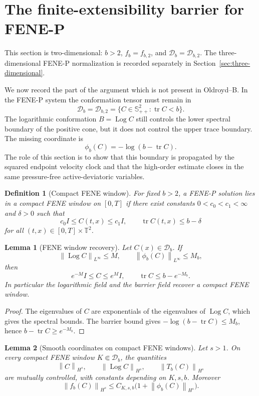 \documentclass[11pt]{article}
\newtheorem{lemma}{Lemma}[section]
\newtheorem{definition}{Definition}[section]
\newcommand{\T}{\mathbb T}
\newcommand{\Id}{I}
\newcommand{\Spp}{\mathbb S_{++}}
\newcommand{\tr}{\operatorname{tr}}
\newcommand{\Log}{\operatorname{Log}}
\newcommand{\calD}{\mathcal D}
\newcommand{\norm}[1]{\left\lVert #1\right\rVert}
\begin{document}
\section{The finite-extensibility barrier for FENE-P}
\label{sec:fene-barrier}

This section is two-dimensional: \(b>2\), \(f_b=f_{b,2}\), and
\(\calD_b=\calD_{b,2}\).  The three-dimensional FENE-P normalization is recorded
separately in Section~\ref{sec:three-dimensional}.

We now record the part of the argument which is not present in Oldroyd--B.  In
the FENE-P system the conformation tensor must remain in
\[
  \calD_b=\calD_{b,2}=\{C\in\Spp^2:\tr C<b\}.
\]
The logarithmic conformation \(B=\Log C\) still controls the lower spectral
boundary of the positive cone, but it does not control the upper trace
boundary.  The missing coordinate is
\[
  \phi_b(C)=-\log(b-\tr C).
\]
The role of this section is to show that this boundary is propagated by the
squared endpoint velocity clock and that the high-order estimate closes in the
same pressure-free active-deviatoric variables.

\begin{definition}[Compact FENE window]
For fixed \(b>2\), a FENE-P solution lies in a compact FENE window on \([0,T]\) if there exist
constants \(0<c_0<c_1<\infty\) and \(\delta>0\) such that
\[
  c_0\Id\le C(t,x)\le c_1\Id,\qquad \tr C(t,x)\le b-\delta
\]
for all \((t,x)\in[0,T]\times\T^2\).
\end{definition}

\begin{lemma}[FENE window recovery]
\label{lem:fene-window-recovery}
Let \(C(x)\in\calD_b\).  If
\[
  \norm{\Log C}_{L^\infty}\le M,\qquad
  \norm{\phi_b(C)}_{L^\infty}\le M_b,
\]
then
\[
  e^{-M}\Id\le C\le e^M\Id,\qquad \tr C\le b-e^{-M_b}.
\]
In particular the logarithmic field and the barrier field recover a compact
FENE window.
\end{lemma}

\begin{proof}
The eigenvalues of \(C\) are exponentials of the eigenvalues of \(\Log C\),
which gives the spectral bounds.  The barrier bound gives
\(-\log(b-\tr C)\le M_b\), hence \(b-\tr C\ge e^{-M_b}\).
\end{proof}

\begin{lemma}[Smooth coordinates on compact FENE windows]
\label{lem:fene-coordinate-equivalence}
Let \(s>1\).  On every compact FENE window \(K\Subset\calD_b\), the quantities
\[
  \norm{C}_{H^s},\qquad
  \norm{\Log C}_{H^s},\qquad
  \norm{T_b(C)}_{H^s}
\]
are mutually controlled, with constants depending on \(K,s,b\).  Moreover
\[
  \norm{f_b(C)}_{H^s}
  \le C_{K,s,b}\bigl(1+\norm{\phi_b(C)}_{H^s}\bigr).
\]
\end{lemma}
\end{document}
